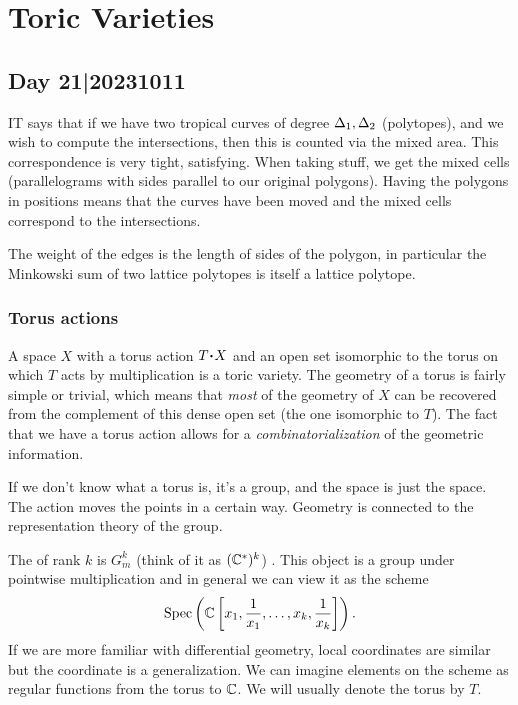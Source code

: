 \documentclass[12pt]{memoir}
\begin{document}
\chapter{Toric Varieties}
\section{Day 21|20231011}

IT says that if we have two tropical curves of degree $\Delta_1,\Delta_2$ (polytopes), and we wish to compute the intersections, then this is counted via the mixed area. This correspondence is very tight, satisfying. When taking stuff, we get the mixed cells (parallelograms with sides parallel to our original polygons). Having the polygons in positions means that the curves have been moved and the mixed cells correspond to the intersections.\par 
The weight of the edges is the length of sides of the polygon, in particular the Minkowski sum of two lattice polytopes is itself a lattice polytope.

\subsection{Torus actions}

A space $X$ with a torus action $T\.X$ and an open set isomorphic to the torus on which $T$ acts by multiplication is a toric variety. The geometry of a torus is fairly simple or trivial, which means that \emph{most} of the geometry of $X$ can be recovered from the complement of this dense open set (the one isomorphic to $T$). The fact that we have a torus action allows for a \emph{combinatorialization} of the geometric information.\par 
If we don't know what a torus is, it's a group, and the space is just the space. The action moves the points in a certain way. Geometry is connected to the representation theory of the group.

\begin{Def}
    The  of rank $k$ is $G_m^k$ (think of it as $(\mathbb{C}^\ast)^k$) . This object is a group under pointwise multiplication and in general we can view it as the scheme 
    $$\operatorname{Spec}\left(\mathbb{C}\left\lbrack x_1,\frac{1}{x_1},\dots,x_k,\frac{1}{x_k}\right\rbrack\right).$$
    If we are more familiar with differential geometry, local coordinates are similar but the coordinate is a generalization. We can imagine elements on the scheme as regular functions from the torus to $\mathbb{C}$. We will usually denote the torus by $T$.
\end{Def}
\end{document}
